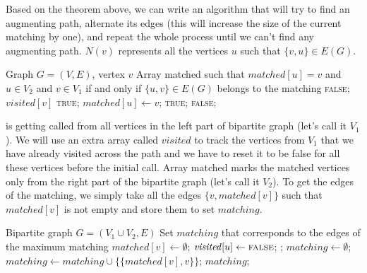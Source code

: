 \documentclass[12pt]{report}
\numberwithin{algorithm}{chapter}
\newcommand{\True}{\textsc{true}}
\newcommand{\False}{\textsc{false}}
\begin{document}
	Based on the theorem above, we can write an algorithm that will try to find an augmenting path, alternate its edges (this will increase the size of the current matching by one), and repeat the whole process until we can't find any augmenting path. $N(v)$ represents all the vertices $u$ such that $\{v, u\} \in E(G)$. 

	\begin{algorithm}[H]
	\caption{Augmenting Path Algorithm}
	\label{DfsAugmentingPath}
	\begin{algorithmic}[1]
	\Require Graph $G=(V,E)$, vertex $v$
	\Ensure Array matched such that $\mathit{matched}[u] = v$ and $u \in V_{2}$ and $v \in V_{1}$ if and only if $\{u, v\} \in E(G)$ belongs to the matching
			\State \Return \False;
		\EndIf
		\State $\mathit{visited}[v]$ \gets \True;
				\State $\mathit{matched}[u] \gets v$;
		        \State \Return \True;
		    \EndIf
		\EndFor
		\State \Return \False;
	\EndFunction
	\end{algorithmic}
	\end{algorithm}
	
	 is getting called from all vertices in the left part of bipartite graph (let's call it $V_{1}$). We will use an extra array called $\mathit{visited}$ to track the vertices from $V_{1}$ that we have already visited across the path and we have to reset it to be false for all these vertices before the initial call. Array matched marks the matched vertices only from the right part of the bipartite graph (let's call it $V_{2}$).  To get the edges of the matching, we simply take all the edges $\{v, \mathit{matched}[v]\}$ such that $\mathit{matched}[v]$ is not empty and store them to set $\mathit{matching}$.

	\begin{algorithm}[H]
	\caption{Maximum Bipartite Matching in $O(nm)$}
	\label{max-bm1}
	\begin{algorithmic}[1]
	\Require Bipartite graph $G=(V_1 \cup V_2,E)$
	\Ensure Set $\mathit{matching}$ that corresponds to the edges of the maximum matching
			\State $\mathit{matched}[v] \gets \emptyset$;
		\EndFor
				\State $\mathit{visited}[u] \gets \False$;
			\EndFor
			\State {};
		\EndFor
		\State $\mathit{matching} \gets \emptyset$;
				\State $\mathit{matching} \gets \mathit{matching} \cup \{\{\mathit{matched}[v], v\}\}$;
			\EndIf
		\EndFor
		\State \Return $\mathit{matching}$;
	\EndFunction
	\end{algorithmic}
	\end{algorithm}
\end{document}
